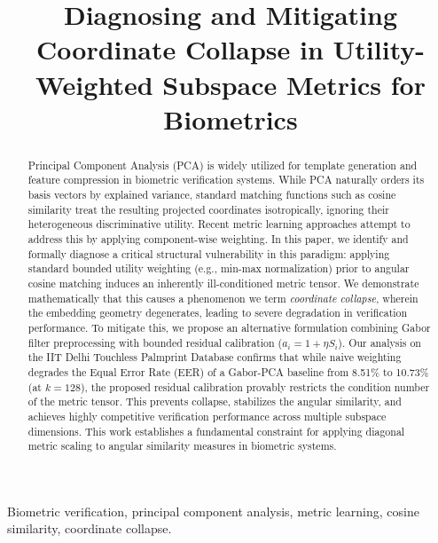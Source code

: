 \documentclass[conference]{IEEEtran}
\begin{document}
\title{Diagnosing and Mitigating Coordinate Collapse in Utility-Weighted Subspace Metrics for Biometrics}

\author{
}

\maketitle

\begin{abstract}
Principal Component Analysis (PCA) is widely utilized for template generation and feature compression in biometric verification systems. While PCA naturally orders its basis vectors by explained variance, standard matching functions such as cosine similarity treat the resulting projected coordinates isotropically, ignoring their heterogeneous discriminative utility. Recent metric learning approaches attempt to address this by applying component-wise weighting. In this paper, we identify and formally diagnose a critical structural vulnerability in this paradigm: applying standard bounded utility weighting (e.g., min-max normalization) prior to angular cosine matching induces an inherently ill-conditioned metric tensor. We demonstrate mathematically that this causes a phenomenon we term \textit{coordinate collapse}, wherein the embedding geometry degenerates, leading to severe degradation in verification performance. To mitigate this, we propose an alternative formulation combining Gabor filter preprocessing with bounded residual calibration ($a_i = 1 + \eta S_i$). Our analysis on the IIT Delhi Touchless Palmprint Database confirms that while naive weighting degrades the Equal Error Rate (EER) of a Gabor-PCA baseline from 8.51\% to 10.73\% (at $k=128$), the proposed residual calibration provably restricts the condition number of the metric tensor. This prevents collapse, stabilizes the angular similarity, and achieves highly competitive verification performance across multiple subspace dimensions. This work establishes a fundamental constraint for applying diagonal metric scaling to angular similarity measures in biometric systems.
\end{abstract}

\begin{IEEEkeywords}
Biometric verification, principal component analysis, metric learning, cosine similarity, coordinate collapse.
\end{IEEEkeywords}
\end{document}

